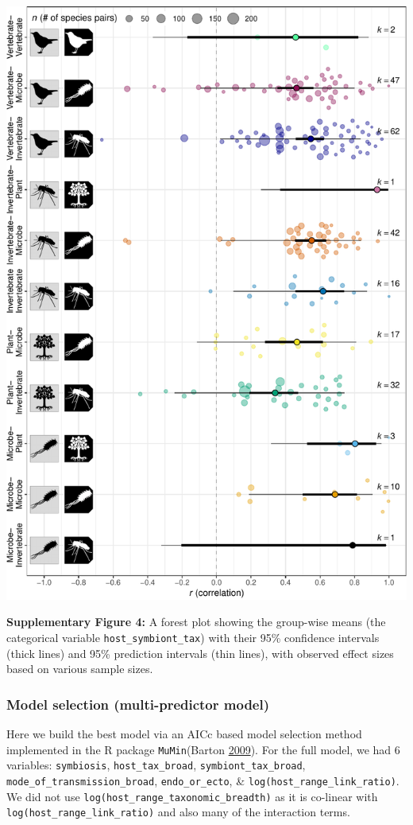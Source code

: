 \documentclass[
]{article}
\begin{document}
\includegraphics{Supporting_Information_files/figure-latex/unnamed-chunk-47-1.pdf}

\textbf{Supplementary Figure 4:} A forest plot showing the group-wise
means (the categorical variable \texttt{host\_symbiont\_tax}) with their
95\% confidence intervals (thick lines) and 95\% prediction intervals
(thin lines), with observed effect sizes based on various sample sizes.

\hypertarget{model-selection-multi-predictor-model}{%
\subsubsection{Model selection (multi-predictor
model)}\label{model-selection-multi-predictor-model}}

Here we build the best model via an AICc based model selection method
implemented in the R package \texttt{MuMin}(Barton
\protect\hyperlink{ref-barton2009mumin}{2009}). For the full model, we
had 6 variables: \texttt{symbiosis}, \texttt{host\_tax\_broad},
\texttt{symbiont\_tax\_broad}, \texttt{mode\_of\_transmission\_broad},
\texttt{endo\_or\_ecto}, \& \texttt{log(host\_range\_link\_ratio)}. We
did not use \texttt{log(host\_range\_taxonomic\_breadth)} as it is
co-linear with \texttt{log(host\_range\_link\_ratio)} and also many of
the interaction terms.
\end{document}
